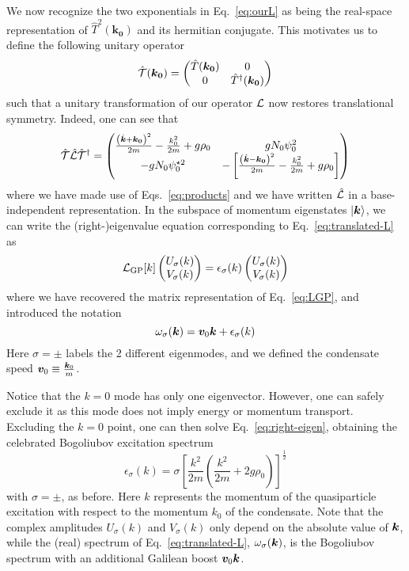 We now recognize the two exponentials in Eq.~\eqref{eq:ourL} as being
the real-space representation of $\hat{T}^2(\bm{k_0})$ and its
hermitian conjugate. This motivates us to define the following unitary
operator
%
\begin{equation}\label{eq:ucal}
  \hat{\mathcal{T}}(\bm{k_0}) = \begin{pmatrix} \hat{T}(\bm{k_0}) & 0\\ 0 & \hat{T}^{\dagger}(\bm{k_0}) \end{pmatrix}
\end{equation}
% 
such that a unitary transformation of our operator $\mathcal{L}$ now restores
translational symmetry. Indeed, one can see that
%
\begin{equation}\label{eq:translated-L}
  \hat{\mathcal{T}} \hat{\mathcal{L}} \hat{\mathcal{T}}^{\dagger} = \begin{pmatrix} \frac{\left(\hat{\bm{k}} + \bm{k_0}\right)^2}{2m} - \frac{k_0^2}{2m} + g\rho_0 & g N_0 \psi_0^2\\ - g N_0 \psi_0^{\star 2} & -\left[\frac{\left(\hat{\bm{k}} - \bm{k_0}\right)^2}{2m} - \frac{k_0^2}{2m} + g\rho_0 \right] \end{pmatrix}
\end{equation}
% 
where we have made use of Eqs.~\eqref{eq:products} and we have written
$\hat{\mathcal{L}}$ in a base-independent representation.  In the subspace of
momentum eigenstates $\vert \bm{k} \rangle$, we can write the (right-)eigenvalue
equation corresponding to Eq.~\eqref{eq:translated-L} as
%
\begin{equation}\label{eq:right-eigen}
  \mathcal{L}_{\text{GP}} [k] \begin{pmatrix} U_\sigma(k)\\ V_\sigma(k) \end{pmatrix} = \epsilon_\sigma(k) \begin{pmatrix} U_\sigma(k)\\ V_\sigma(k) \end{pmatrix}
\end{equation}
% 
where we have recovered the matrix representation of
Eq.~\eqref{eq:LGP}, and introduced the notation
%
\begin{equation}\label{eq:boosted-bogoliubov}
  \omega_\sigma(\bm{k}) = \bm{v}_0 \bm{k} + \epsilon_\sigma(k)
\end{equation}
% 
Here $\sigma = \pm$ labels the 2 different eigenmodes, and we defined
the condensate speed $\bm{v}_0 \equiv \frac{\bm{k}_0}{m}$.

Notice that the $k=0$ mode has only one eigenvector. However, one can
safely exclude it as this mode does not imply energy or momentum
transport. Excluding the $k = 0$ point, one can then solve
Eq.~\eqref{eq:right-eigen}, obtaining the celebrated Bogoliubov
excitation spectrum
%
\begin{equation}\label{eq:bogoliubov}
  \epsilon_\sigma(k) = \sigma \left[\frac{k^2}{2m}\left(\frac{k^2}{2m} + 2 g \rho_0 \right) \right]^{\frac{1}{2}}
\end{equation}
% 
with $\sigma = \pm$, as before. Here $k$ represents the momentum of
the quasiparticle excitation with respect to the momentum $k_0$ of the
condensate. Note that the complex amplitudes $U_\sigma(k)$ and
$V_\sigma(k)$ only depend on the absolute value of $\bm{k}$, while the
(real) spectrum of Eq.~\eqref{eq:translated-L}, $\omega_\sigma(\bm{k})$,
is the Bogoliubov spectrum with an additional Galilean boost
$\bm{v}_0 \bm{k}$.

